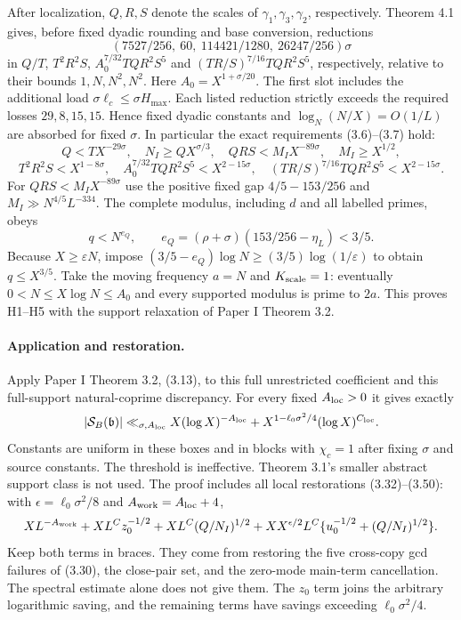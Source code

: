 After localization, $Q,R,S$ denote the scales of
$\gamma_1,\gamma_3,\gamma_2$, respectively. Theorem 4.1 gives, before
fixed dyadic rounding and base conversion, reductions
\[
 (7527/256,\ 60,\ 114421/1280,\ 26247/256)\sigma
\]
in $Q/T$, $T^2R^2S$, $A_0^{7/32}TQR^2S^5$ and
$(TR/S)^{7/16}TQR^2S^5$, respectively, relative to their bounds
$1,N,N^2,N^2$. Here $A_0=X^{1+\sigma/20}$.
The first slot includes the additional load $\sigma\ell_c\le\sigma H_{\max}$.
Each listed reduction strictly exceeds the required losses
$29,8,15,15$. Hence fixed dyadic constants and
$\log_N(N/X)=O(1/L)$ are absorbed for fixed $\sigma$.
In particular the exact requirements (3.6)--(3.7) hold:
\[
 Q<TX^{-29\sigma},\quad N_I\ge QX^{\sigma/3},\quad
 QRS<M_IX^{-89\sigma},\quad M_I\ge X^{1/2},
\]
\[
 T^2R^2S<X^{1-8\sigma},\quad
 A_0^{7/32}TQR^2S^5<X^{2-15\sigma},\quad
 (TR/S)^{7/16}TQR^2S^5<X^{2-15\sigma}.
\]
For $QRS<M_IX^{-89\sigma}$ use the positive fixed gap
$4/5-153/256$ and $M_I\gg N^{4/5}L^{-334}$.
The complete modulus, including $d$ and all labelled primes, obeys
\[
 q<N^{e_Q},\qquad e_Q=(\rho+\sigma)(153/256-\eta_L)<3/5.
\]
Because $X\ge\varepsilon N$, impose
$(3/5-e_Q)\log N\ge(3/5)\log(1/\varepsilon)$ to obtain
$q\le X^{3/5}$. Take the moving frequency $a=N$ and
$K_{\rm scale}=1$: eventually
$0<N\le X\log N\le A_0$ and every supported modulus is prime to $2a$.
This proves H1--H5 with the support relaxation of Paper I Theorem 3.2.

\paragraph{Application and restoration.}
Apply Paper I Theorem 3.2, (3.13), to this full unrestricted coefficient
and this full-support natural-coprime discrepancy. For every fixed
$A_{\rm loc}>0$ it gives exactly
\[
 |\mathcal S_B(\mathfrak b)|
 \ll_{\sigma,A_{\rm loc}}X(\log X)^{-A_{\rm loc}}
       +X^{1-\ell_0\sigma^2/4}(\log X)^{C_{\rm loc}}.
\]
Constants are uniform in these boxes and in blocks with $\chi_c=1$ after fixing
$\sigma$ and source constants. The threshold is ineffective.
Theorem 3.1's smaller abstract support class is not used.
The proof includes all local restorations (3.32)--(3.50):
with $\epsilon=\ell_0\sigma^2/8$ and $A_{\rm work}=A_{\rm loc}+4$,
\[
 XL^{-A_{\rm work}}+XL^Cz_0^{-1/2}+XL^C(Q/N_I)^{1/2}
 +XX^{\epsilon/2}L^C\{u_0^{-1/2}+(Q/N_I)^{1/2}\}.
\]
Keep both terms in braces. They come from restoring the five
cross-copy gcd failures of (3.30), the close-pair set, and the zero-mode
main-term cancellation. The spectral
estimate alone does not give them. The $z_0$ term joins the arbitrary logarithmic saving,
and the remaining terms have savings exceeding $\ell_0\sigma^2/4$.

